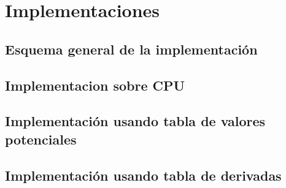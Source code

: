 \documentclass[a4paper,10pt]{report}
\begin{document}
\chapter{Implementaciones}

\section{Esquema general de la implementación}
\section{Implementacion sobre CPU}
\section{Implementación usando tabla de valores potenciales}
\section{Implementación usando tabla de derivadas}
\end{document}
